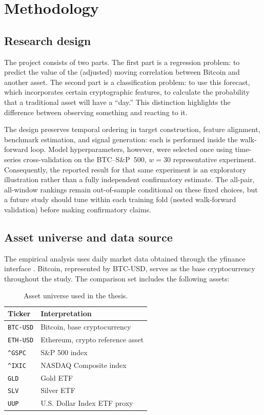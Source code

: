 \section{Methodology}

\subsection{Research design}

The project consists of two parts. The first part is a regression problem: to predict the value of the (adjusted) moving correlation between Bitcoin and another asset. The second part is a classification problem: to use this forecast, which incorporates certain cryptographic features, to calculate the probability that a traditional asset will have a ``day.'' This distinction highlights the difference between observing something and reacting to it.

The design preserves temporal ordering in target construction, feature alignment, benchmark estimation, and signal generation: each is performed inside the walk-forward loop. Model hyperparameters, however, were selected once using time-series cross-validation on the BTC--S\&P~500, $w=30$ representative experiment. Consequently, the reported result for that same experiment is an exploratory illustration rather than a fully independent confirmatory estimate. The all-pair, all-window rankings remain out-of-sample conditional on these fixed choices, but a future study should tune within each training fold (nested walk-forward validation) before making confirmatory claims.

\subsection{Asset universe and data source}

The empirical analysis uses daily market data obtained through the yfinance interface \cite{yfinance2026}. Bitcoin, represented by BTC-USD, serves as the base cryptocurrency throughout the study. The comparison set includes the following assets:

\begin{table}[H]
    \centering
    \caption{Asset universe used in the thesis.}
    \label{tab:asset_universe}
    \begin{tabular}{ll}
        \toprule
        Ticker & Interpretation \\
        \midrule
        \texttt{BTC-USD} & Bitcoin, base cryptocurrency \\
        \texttt{ETH-USD} & Ethereum, crypto reference asset \\
        \texttt{\textasciicircum{}GSPC} & S\&P 500 index \\
        \texttt{\textasciicircum{}IXIC} & NASDAQ Composite index \\
        \texttt{GLD} & Gold ETF \\
        \texttt{SLV} & Silver ETF \\
        \texttt{UUP} & U.S. Dollar Index ETF proxy \\
        \bottomrule
    \end{tabular}
\end{table}

